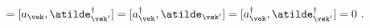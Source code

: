 \begin{equation}
   [a_{\vek},\atilde_{\vek'}]=[a_{\vek},\atilde^\dagger_{\vek'}]
   = [a^{\dagger}_{\vek},\atilde_{\vek'}]
   =[a^{\dagger}_{\vek},\atilde^\dagger_{\vek'}]=0 \ .
\end{equation}

